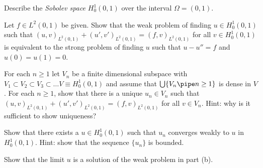 \begin{alist}
\item Describe the \emph{Sobolev space} $H_0^1(0,1)$ over the interval 
$\Omega=(0,1)$. 
\item Let $f\in L^2(0,1)$ be given. Show that the weak problem 
of finding $u\in H_0^1(0,1)$ such that
$(u,v)_{L^2(0,1)}+(u',v')_{L^2(0,1)}=(f,v)_{L^2(0,1)}$ for all $v\in
H_0^1(0,1)$ is equivalent to the strong problem of finding $u$ such
that $u-u''=f$ and $u(0)=u(1)=0$.
\item For each $n\geq 1$ let $V_n$ be a finite dimensional subspace
with $V_1\subset V_2\subset V_3\subset \ldots V\equiv H_0^1(0,1)$ and
assume that $\bigcup \{V_n \pipe n\geq 1\}$ is dense in $V$. For each $n\geq
1$, show that there is a unique $u_n\in V_n$ such that
$(u,v)_{L^2(0,1)}+(u',v')_{L^2(0,1)}=(f,v)_{L^2(0,1)}$ for all $v\in
V_n$. Hint: why is it sufficient to show uniqueness?
\item Show that there exists a $u\in H_0^1(0,1)$ such that $u_n$
converges weakly to $u$ in $H_0^1(0,1)$. Hint: show that the sequence
$\{u_n\}$ is bounded.
\item Show that the limit $u$ is a solution of the weak problem in
part (b).
\end{alist}
